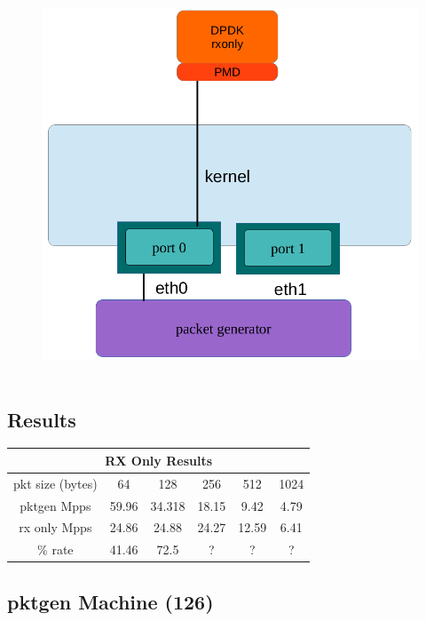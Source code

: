 \documentclass[letter]{article}
\begin{document}
{{\begin{figure}[H]
\hbox{\vspace{0.5cm}\includegraphics[scale=0.4]{rx-only} }
\end{figure}

\subsection{Results}
\large
\begin{center}
\begin{tabular}{ |c|c|c|c|c|c| }
\hline
\multicolumn{6}{|c|}{RX Only Results} \\
 \hline
 pkt size (bytes) & 64 & 128 & 256 & 512 & 1024\\ 
\hline
 pktgen Mpps & 59.96 & 34.318 & 18.15 & 9.42 & 4.79\\ 
 rx only Mpps & 24.86 & 24.88 & 24.27 & 12.59 & 6.41\\ 
\hline
\rowcolor{yellow}
\% rate & 41.46 & 72.5 & ? & ? & ?\\
 \hline
\end{tabular}
\end{center}

\subsection{pktgen Machine (126)}

}}
\end{document}

